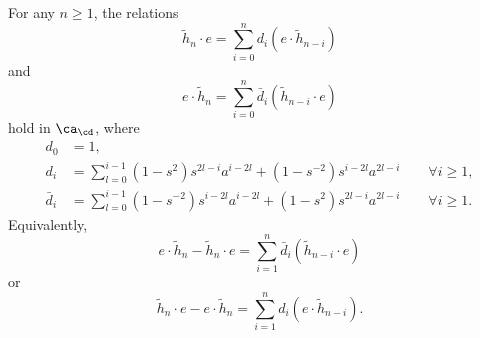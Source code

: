 \begin{theorem} \label{prop:hncommutator}
For any $n \geq 1$, the relations
\begin{equation}
\tilde{h}_n \cdot e = \sum_{i=0}^n d_i (e \cdot \tilde{h}_{n-i})
\end{equation}
and
\begin{equation}
e \cdot \tilde{h}_n = \sum_{i=0}^n \bar{d}_i (\tilde{h}_{n-i} \cdot e)
\end{equation}
hold in $\ca_\cd$, where
\begin{align*}
d_0 & = 1, \\
d_i & = \sum_{l=0}^{i-1} (1 - s^2) s^{2l-i} a^{i-2l} + (1 - s^{-2}) s^{i-2l} a^{2l-i} \qquad \forall i \geq 1, \\
\bar{d}_i & = \sum_{l=0}^{i-1} (1 - s^{-2}) s^{i-2l} a^{i-2l} + (1 - s^{2}) s^{2l-i} a^{2l-i} \qquad \forall i \geq 1.
\end{align*}
Equivalently,
\begin{equation}
e \cdot \tilde{h}_n - \tilde{h}_n \cdot e = \sum_{i=1}^n \bar{d}_i (\tilde{h}_{n-i} \cdot e)
\end{equation}
or 
\begin{equation}
\tilde{h}_n \cdot e - e \cdot \tilde{h}_n = \sum_{i=1}^n d_i (e \cdot \tilde{h}_{n-i}).
\end{equation}
\end{theorem}
